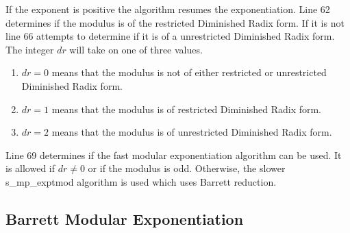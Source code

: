 \documentclass[b5paper]{book}
\begin{document}
If the exponent is positive the algorithm resumes the exponentiation.  Line 62 determines if the modulus is of the restricted Diminished Radix 
form.  If it is not line 66 attempts to determine if it is of a unrestricted Diminished Radix form.  The integer $dr$ will take on one
of three values.

\begin{enumerate}
\item $dr = 0$ means that the modulus is not of either restricted or unrestricted Diminished Radix form.
\item $dr = 1$ means that the modulus is of restricted Diminished Radix form.
\item $dr = 2$ means that the modulus is of unrestricted Diminished Radix form.
\end{enumerate}

Line 69 determines if the fast modular exponentiation algorithm can be used.  It is allowed if $dr \ne 0$ or if the modulus is odd.  Otherwise,
the slower s\_mp\_exptmod algorithm is used which uses Barrett reduction.  

\subsection{Barrett Modular Exponentiation}
\end{document}
